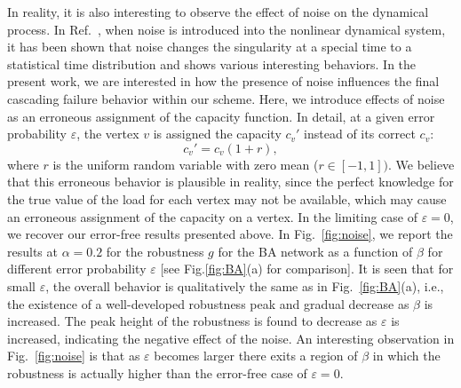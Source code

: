 \documentclass[doublecol]{epl2}
\begin{document}
In reality, it is also interesting to observe the effect of noise on
the dynamical process. In Ref.~\cite{Fogedby}, 
when noise is introduced into the nonlinear dynamical system, 
it has been shown that noise changes the
singularity at a special time to a statistical time distribution and
shows various interesting behaviors. 
In the present work, we are
interested in how the presence of noise influences the final
cascading failure behavior within our scheme. Here, we introduce
effects of noise as an erroneous assignment of the capacity
function. In detail, at a given error probability $\varepsilon$,
the vertex $v$ is assigned the capacity $c_v'$ instead of its
correct $c_v$:
\begin{equation}
c_v'=c_v ( 1 + r),
\end{equation}
where $r$ is the uniform random variable with zero mean
($r\in{[-1,1]})$. We believe that this erroneous behavior is
plausible in reality, since the perfect knowledge for the true
value of the load for each vertex may not be available, which may cause an
erroneous assignment of the capacity  on a vertex. In the limiting
case of $\varepsilon = 0$, we recover our error-free results
presented above. In Fig.~\ref{fig:noise}, we report the results at
$\alpha=0.2$ for the robustness $g$ for the BA network as a function of
$\beta$ for different error probability $\varepsilon$ [see
Fig.\ref{fig:BA}(a) for comparison]. It is seen that for small
$\varepsilon$, the overall behavior is qualitatively the same as in
Fig.~\ref{fig:BA}(a), i.e., the existence of a well-developed
robustness peak and gradual decrease as $\beta$ is increased. The
peak height of the robustness is found to decrease as $\varepsilon$
is increased, indicating the negative effect of the noise. An
interesting observation in Fig.~\ref{fig:noise} is that as
$\varepsilon$ becomes larger there exits a region of $\beta$ in
which the robustness is actually higher than the error-free case of
$\varepsilon = 0$.
\end{document}
